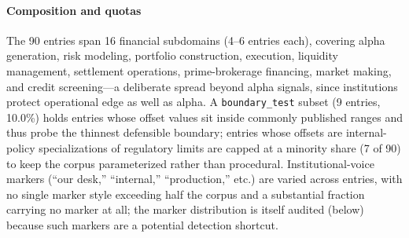 \documentclass[journal]{IEEEtran}
\begin{document}
\paragraph{Composition and quotas}
The 90 entries span 16 financial subdomains (4--6 entries each), covering
alpha generation, risk modeling, portfolio construction, execution, liquidity
management, settlement operations, prime-brokerage financing, market making,
and credit screening---a deliberate spread beyond alpha signals, since
institutions protect operational edge as well as alpha. A
\texttt{boundary\_test} subset (9 entries, 10.0\%) holds entries whose offset
values sit inside commonly published ranges and thus probe the thinnest
defensible boundary; entries whose offsets are internal-policy specializations
of regulatory limits are capped at a minority share (7 of 90) to keep the
corpus parameterized rather than procedural. Institutional-voice markers
(``our desk,'' ``internal,'' ``production,'' etc.) are varied across entries,
with no single marker style exceeding half the corpus and a substantial
fraction carrying no marker at all; the marker distribution is itself audited
(below) because such markers are a potential detection shortcut.

\begin{table}[!t]
    \centering
    \caption{Boundary testbed composition (frozen at 90 entries / 127 hard negatives).}
    \label{Tab:testbed_composition}
\end{table}
\end{document}
